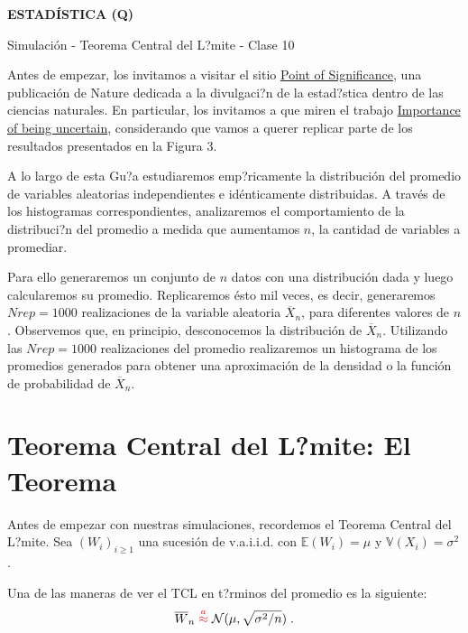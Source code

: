 \documentclass[12pt]{article}
\begin{document}
\centerline{\bf ESTAD\'ISTICA (Q)}%

\medskip


{\sc Simulaci\'on - Teorema Central del L?mite  - Clase 10}

\bigskip 


Antes de empezar, los invitamos a visitar el sitio \href{https://www.nature.com/collections/qghhqm/pointsofsignificance}{Point of Significance}, una publicaci\'on de Nature dedicada a la divulgaci?n de la estad?stica dentro de las ciencias naturales. 
En particular, los invitamos a que miren el trabajo  \href{https://www.nature.com/articles/nmeth.2613
} {Importance of being uncertain}, considerando que vamos a querer replicar parte de los resultados presentados en la Figura 3. 


A lo largo de esta Gu?a estudiaremos emp?ricamente la distribuci\'{o}n del promedio de
variables aleatorias independientes e id\'{e}nticamente distribuidas. A trav\'{e}s de
los histogramas correspondientes, analizaremos el comportamiento de la distribuci?n del promedio a medida que aumentamos $n$, la cantidad de variables a promediar. 

Para ello generaremos un conjunto de $n$  datos  con una
distribuci\'{o}n dada y luego calcularemos su promedio. 
Replicaremos \'{e}sto mil veces, es decir, generaremos $Nrep=1000$  realizaciones de la variable aleatoria  $\overline{X}_n$,  para diferentes valores de $n$.  Observemos que, en principio,
desconocemos la distribuci\'{o}n de $\overline{X}_n$. Utilizando  las $Nrep=1000$ realizaciones del promedio 
realizaremos un histograma de los promedios generados para
obtener una aproximaci\'{o}n de la densidad o la funci\'{o}n de probabilidad
de $\overline{X}_n$.

\section{Teorema Central del L?mite: El Teorema}
Antes de empezar con nuestras simulaciones, recordemos 
el  Teorema  Central del L?mite. Sea $(W_i)_{i\geq 1}$ una sucesi\'on de v.a.i.i.d.
con $\mathbb E(W_i)=\mu$ y $\mathbb{V}(X_i)=\sigma^2$. 

Una de las maneras de ver el TCL en t?rminos del promedio es la siguiente: 
\begin{equation}
\overline W_n\;{\color{red}\buildrel{a}\over\approx}\;
\mathcal N(\mu,\sqrt{\sigma^2/n})\;.
\end{equation}
\end{document}
